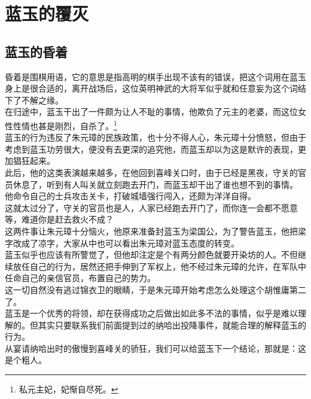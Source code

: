\section{蓝玉的覆灭}
\ifnum{}
	\begin{multicols}{\theparacolNo}
\fi
\subsection{蓝玉的昏着}
昏着是围棋用语，它的意思是指高明的棋手出现不该有的错误，把这个词用在蓝玉身上是很合适的，离开战场后，这位英明神武的大将军似乎就和任意妄为这个词结下了不解之缘。\\

在归途中，蓝玉干出了一件颇为让人不耻的事情，他欺负了元主的老婆，而这位女性性情也甚是刚烈，自杀了。\footnote{私元主妃，妃惭自尽死。}\\

蓝玉的行为违反了朱元璋的民族政策，也十分不得人心，朱元璋十分愤怒，但由于考虑到蓝玉功劳很大，便没有去更深的追究他，而蓝玉却以为这是默许的表现，更加猖狂起来。\\

此后，他的这类表演越来越多，在他回到喜峰关口时，由于已经是黑夜，守关的官员休息了，听到有人叫关就立刻跑去开门，而蓝玉却干出了谁也想不到的事情。\\

他命令自己的士兵攻击关卡，打破城墙强行闯入，还颇为洋洋自得。\\

这就太过分了，守关的官员也是人，人家已经跑去开门了，而你连一会都不愿意等，难道你是赶去救火不成？\\

这两件事让朱元璋十分恼火，他原来准备封蓝玉为梁国公，为了警告蓝玉，他把梁字改成了凉字，大家从中也可以看出朱元璋对蓝玉态度的转变。\\

蓝玉似乎也应该有所警觉了，但他却注定是个有两分颜色就要开染坊的人。不但继续放任自己的行为，居然还把手伸到了军权上，他不经过朱元璋的允许，在军队中任命自己的亲信官员，布置自己的势力。\\

这一切自然没有逃过锦衣卫的眼睛，于是朱元璋开始考虑怎么处理这个胡惟庸第二了。\\

蓝玉是一个优秀的将领，却在获得成功之后做出如此多不法的事情，似乎是难以理解的。但其实只要联系我们前面提到过的纳哈出投降事件，就能合理的解释蓝玉的行为。\\

从宴请纳哈出时的傲慢到喜峰关的骄狂，我们可以给蓝玉下一个结论，那就是：这是个粗人。\\


\end{multicols}
